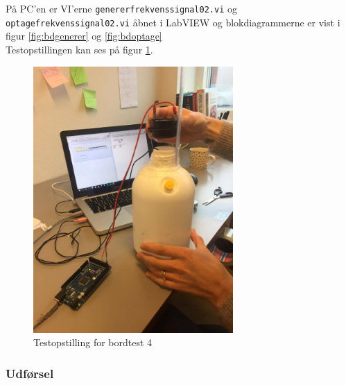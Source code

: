 		På PC'en er VI'erne \texttt{genererfrekvenssignal02.vi} og \texttt{optagefrekvenssignal02.vi} åbnet i LabVIEW og blokdiagrammerne er vist i figur \ref{fig:bdgenerer} og \ref{fig:bdoptage} \\ Testopstillingen kan ses på figur \ref{fig:bt4}.  
		
		\begin{figure}[htb]
			\centering
				\includegraphics[width=3in]{bordtest4}
				\caption{Testopstilling for bordtest 4}	
				\label{fig:bt4}
			\end{figure}
		

		
		\subsubsection{Udførsel}
			
